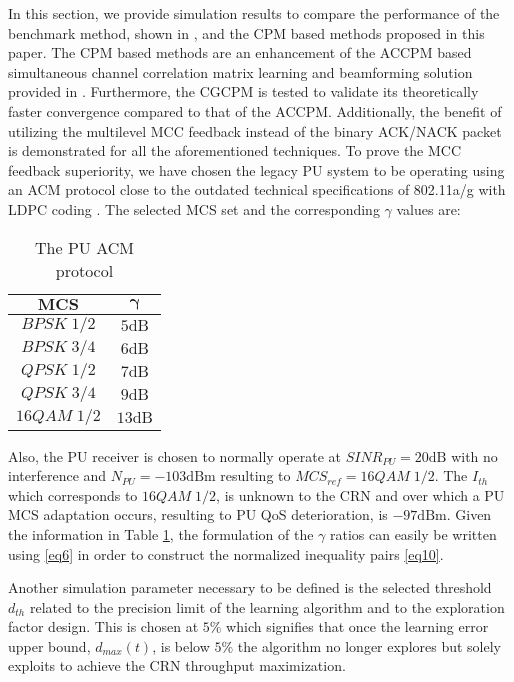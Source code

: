 \documentclass[journal]{IEEEtran}
\begin{document}
In this section, we provide simulation results to compare the performance of the benchmark method, shown in \cite{biban80}, and the CPM based methods proposed in this paper. The CPM based methods are an enhancement of the ACCPM based simultaneous channel correlation matrix learning and beamforming solution provided in \cite{biban73}. Furthermore, the CGCPM is tested to validate its theoretically faster convergence compared to that of the ACCPM. Additionally, the benefit of utilizing the multilevel MCC feedback instead of the binary ACK/NACK packet is demonstrated for all the aforementioned techniques. To prove the MCC feedback superiority, we have chosen the legacy PU system to be operating using an ACM protocol close to the outdated technical specifications of 802.11a/g with LDPC coding \cite{biban92, biban93}. The selected MCS set and the corresponding $\gamma$ values are:

\begin{table}[!h]
\caption{The PU ACM protocol}
\centering
\begin{tabular}{|| c || c ||}
\hline
$\mathbf{MCS}$ & $\boldsymbol{\gamma}$ \\ \hline
$BPSK\;1/2$ & $5\mbox{dB}$ \\
\hline
$BPSK\;3/4$ & $6\mbox{dB}$ \\
\hline
$QPSK\;1/2$ & $7\mbox{dB}$ \\
\hline
$QPSK\;3/4$ & $9\mbox{dB}$ \\
\hline
$16QAM\;1/2$ & $13\mbox{dB}$ \\
\hline
\end{tabular}
\label{table:1}
\end{table}
Also, the PU receiver is chosen to normally operate at $SINR_{PU}=20\mbox{dB}$ with no interference and $N_{PU}=-103\mbox{dBm}$ resulting to $MCS_{ref}=16QAM\;1/2$. The $I_{th}$ which corresponds to $16QAM\;1/2$, is unknown to the CRN and over which a PU MCS adaptation occurs, resulting to PU QoS deterioration, is $-97\mbox{dBm}$. Given the information in Table \ref{table:1}, the formulation of the $\gamma$ ratios can easily be written using \eqref{eq6} in order to construct the normalized inequality pairs \eqref{eq10}.

Another simulation parameter necessary to be defined is the selected threshold $d_{th}$ related to the precision limit of the learning algorithm and to the exploration factor design. This is chosen at $5 \%$ which signifies that once the learning error upper bound, $d_{max}(t)$, is below $5\%$ the algorithm no longer explores but solely exploits to achieve the CRN throughput maximization.
\end{document}
